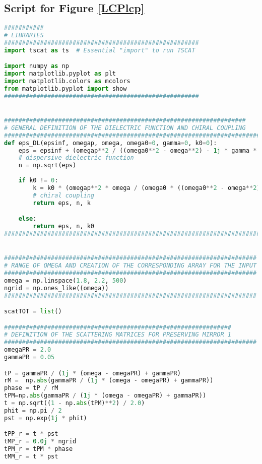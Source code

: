 \documentclass[showpacs,aps,prl,onecolumn,superscriptaddress]{revtex4-1}
\begin{document}
\subsection{Script for Figure \ref{LCPlcp}}
\begin{lstlisting}[language=Python, caption=Script for Figure \ref{LCPlcp}]
###########
# LIBRARIES
######################################################
import tscat as ts  # Essential "import" to run TSCAT

import numpy as np
import matplotlib.pyplot as plt
import matplotlib.colors as mcolors
from matplotlib.pyplot import show
######################################################


###################################################################
# GENERAL DEFINITION OF THE DIELECTRIC FUNCTION AND CHIRAL COUPLING
################################################################################################
def eps_DL(epsinf, omegap, omega, omega0=0, gamma=0, k0=0):
    eps = epsinf + (omegap**2 / ((omega0**2 - omega**2) - 1j * gamma * omega))  
    # dispersive dielectric function
    n = np.sqrt(eps)
    
    if k0 != 0:
        k = k0 * (omegap**2 * omega / (omega0 * ((omega0**2 - omega**2) - 1j * gamma * omega)))  
        # chiral coupling
        return eps, n, k

    else:
        return eps, n, k0
#################################################################################################


######################################################################
# RANGE OF OMEGA AND CREATION OF THE CORRESPONDING ARRAY FOR THE INPUT
######################################################################
omega = np.linspace(1.8, 2.2, 500)
ngrid = np.ones_like((omega))
######################################################################

scatTOT = list()

###############################################################
# DEFINITION OF THE SCATTERING MATRICES FOR PRESERVING MIRROR 1
######################################################################
omegaPR = 2.0
gammaPR = 0.05

tP = gammaPR / (1j * (omega - omegaPR) + gammaPR)
rM =  np.abs(gammaPR / (1j * (omega - omegaPR) + gammaPR))
phase = tP / rM
tPM=np.abs(gammaPR / (1j * (omega - omegaPR) + gammaPR))
t = np.sqrt((1 - np.abs(tPM)**2) / 2.0)
phit = np.pi / 2
pst = np.exp(1j * phit)

tPP_r = t * pst 
tMP_r = 0.0j * ngrid
tPM_r = tPM * phase 
tMM_r = t * pst


\end{lstlisting}
\end{document}
